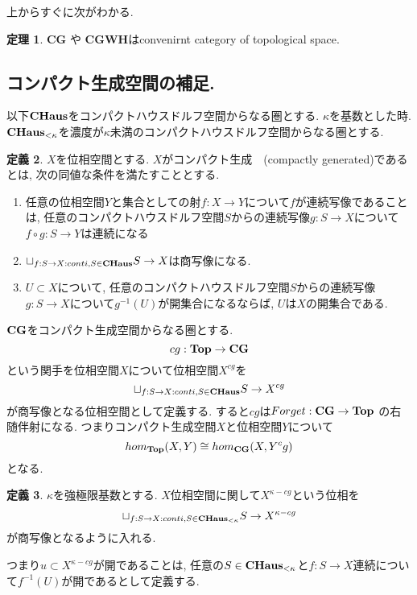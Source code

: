 \documentclass[dvipdfmx,a4paper,11pt]{article}
\theoremstyle{definition}
\newtheorem{thm}{定理}
\newtheorem{dfn}[thm]{定義}
\begin{document}
上からすぐに次がわかる. 

\begin{tcolorbox}
 [colback = white, colframe = green!35!black, fonttitle = \bfseries,breakable = true]
\begin{thm}
{\bf CG} や {\bf CGWH}はconvenirnt category of topological space.
\end{thm}

\end{tcolorbox}


\subsection{コンパクト生成空間の補足.}

以下${\bf CHaus} $をコンパクトハウスドルフ空間からなる圏とする.
$\kappa$を基数とした時. ${\bf CHaus} _{<\kappa}$を濃度が$\kappa$未満のコンパクトハウスドルフ空間からなる圏とする.

 \begin{tcolorbox}
 [colback = white, colframe = green!35!black, fonttitle = \bfseries,breakable = true]
\begin{dfn}
$X$を位相空間とする.
$X$がコンパクト生成　(compactly generated)であるとは, 
次の同値な条件を満たすこととする.
\begin{enumerate}
\item 任意の位相空間$Y$と集合としての射$f : X \to Y$について$f$が連続写像であることは, 任意のコンパクトハウスドルフ空間$S$からの連続写像$g : S \to X$について$f \circ g : S \to Y$は連続になる
\item $\sqcup_{f: S \to X : conti, S \in {\bf CHaus}} S\to X$は商写像になる.
\item $U \subset X$について, 任意のコンパクトハウスドルフ空間$S$からの連続写像$g : S \to X$について$g^{-1}(U)$が開集合になるならば, $U$は$X$の開集合である.
\end{enumerate}
\end{dfn}
\end{tcolorbox}

${\bf CG} $をコンパクト生成空間からなる圏とする.
$$
cg : {\bf Top} \to {\bf CG}
$$
という関手を位相空間$X$について位相空間$X^{cg}$を
$$
\sqcup_{f: S \to X : conti, S \in {\bf CHaus}} S\to X^{cg}
$$
が商写像となる位相空間として定義する. 
すると$cg$は$Forget : {\bf CG} \to {\bf Top}$
の右随伴射になる.
つまりコンパクト生成空間$X$と位相空間$Y$について
$$
hom_{{\bf Top}}(X,Y) \cong hom_{{\bf CG}}(X,Y^cg)
$$
となる.

 \begin{tcolorbox}
 [colback = white, colframe = green!35!black, fonttitle = \bfseries,breakable = true]
\begin{dfn}
$\kappa$を強極限基数とする. 
$X$位相空間に関して$X^{\kappa-cg}$という位相を
$$
\sqcup_{f: S \to X : conti, S \in {\bf CHaus}_{< \kappa}} S\to X^{\kappa-cg}
$$
が商写像となるように入れる. 

つまり$u \subset X^{\kappa-cg}$が開であることは, 任意の$S \in {\bf CHaus}_{< \kappa}$と$f : S \to X$連続について$f^{-1}(U)$が開であるとして定義する. 
\end{dfn}
\end{tcolorbox}
\end{document}

